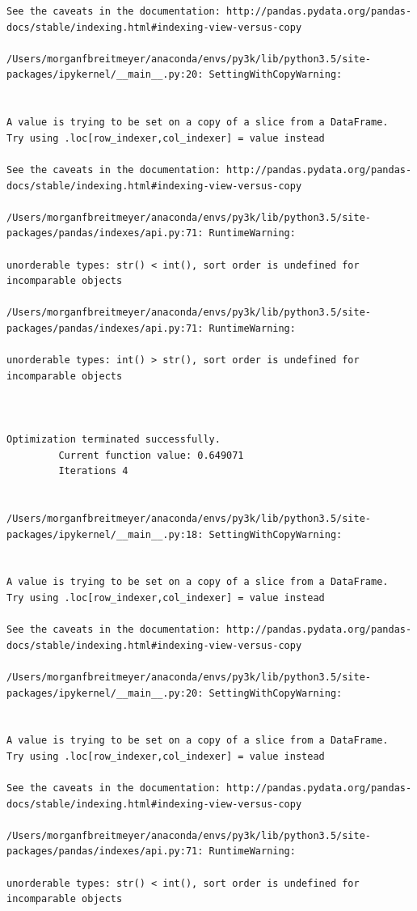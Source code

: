 \begin{lstlisting}
See the caveats in the documentation: http://pandas.pydata.org/pandas-docs/stable/indexing.html#indexing-view-versus-copy

/Users/morganfbreitmeyer/anaconda/envs/py3k/lib/python3.5/site-packages/ipykernel/__main__.py:20: SettingWithCopyWarning:


A value is trying to be set on a copy of a slice from a DataFrame.
Try using .loc[row_indexer,col_indexer] = value instead

See the caveats in the documentation: http://pandas.pydata.org/pandas-docs/stable/indexing.html#indexing-view-versus-copy

/Users/morganfbreitmeyer/anaconda/envs/py3k/lib/python3.5/site-packages/pandas/indexes/api.py:71: RuntimeWarning:

unorderable types: str() < int(), sort order is undefined for incomparable objects

/Users/morganfbreitmeyer/anaconda/envs/py3k/lib/python3.5/site-packages/pandas/indexes/api.py:71: RuntimeWarning:

unorderable types: int() > str(), sort order is undefined for incomparable objects



Optimization terminated successfully.
         Current function value: 0.649071
         Iterations 4


/Users/morganfbreitmeyer/anaconda/envs/py3k/lib/python3.5/site-packages/ipykernel/__main__.py:18: SettingWithCopyWarning:


A value is trying to be set on a copy of a slice from a DataFrame.
Try using .loc[row_indexer,col_indexer] = value instead

See the caveats in the documentation: http://pandas.pydata.org/pandas-docs/stable/indexing.html#indexing-view-versus-copy

/Users/morganfbreitmeyer/anaconda/envs/py3k/lib/python3.5/site-packages/ipykernel/__main__.py:20: SettingWithCopyWarning:


A value is trying to be set on a copy of a slice from a DataFrame.
Try using .loc[row_indexer,col_indexer] = value instead

See the caveats in the documentation: http://pandas.pydata.org/pandas-docs/stable/indexing.html#indexing-view-versus-copy

/Users/morganfbreitmeyer/anaconda/envs/py3k/lib/python3.5/site-packages/pandas/indexes/api.py:71: RuntimeWarning:

unorderable types: str() < int(), sort order is undefined for incomparable objects


\end{lstlisting}
